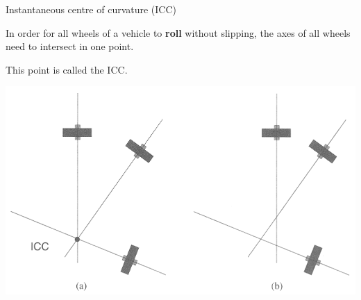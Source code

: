 \documentclass[compress]{beamer}
\begin{document}
\begin{frame}{Instantaneous centre of curvature (ICC)}

In order for all wheels of a vehicle to \textbf{roll} without
slipping, the axes of all wheels need to intersect in one point.

This point is called the ICC.

    \begin{center}
        \includegraphics[width=0.7\linewidth]{icc}
    \end{center}
\end{frame}
\end{document}
